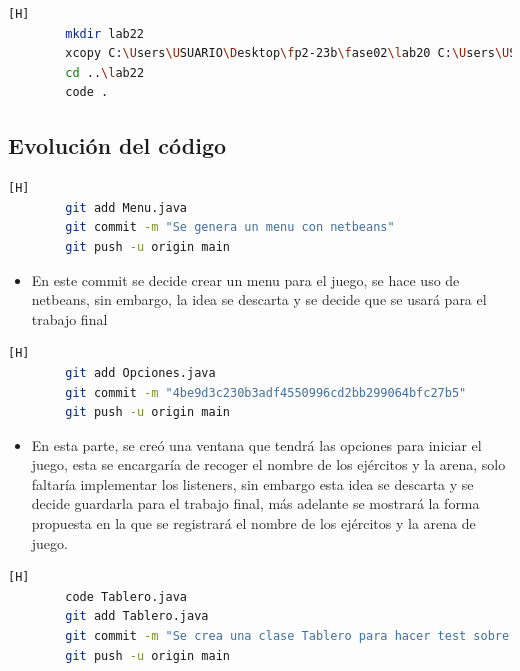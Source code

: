 \documentclass{article}
\begin{document}
	\begin{lstlisting}[language=bash,caption={Se crea la carpeta de laboratorio 20 y se copian los archivos del lab012 al lab20 }][H]
		mkdir lab22
		xcopy C:\Users\USUARIO\Desktop\fp2-23b\fase02\lab20 C:\Users\USUARIO\Desktop\fp2-23b\fase02\lab22 /s /e
		cd ..\lab22
		code .
	\end{lstlisting}
	
	
	

	
	\subsection{Evolución del código}
	
	
	\begin{lstlisting}[language=bash,caption={Commit: d4ded5435b38f7e1e79f718e82fcf34e773e4dd9 }][H]
		git add Menu.java
		git commit -m "Se genera un menu con netbeans"			
		git push -u origin main
	\end{lstlisting}
	
	\begin{itemize}	
	\item En este commit se decide crear un menu para el juego, se hace uso de netbeans, sin embargo, la idea se descarta y se decide que se usará para el trabajo final
	\end{itemize}
	
	
	

	
	
	\begin{lstlisting}[language=bash,caption={Commit: 7108905874788aafe3a0774d8a976766b0b840fd }][H]
		git add Opciones.java
		git commit -m "4be9d3c230b3adf4550996cd2bb299064bfc27b5"			
		git push -u origin main
	\end{lstlisting}
	
	\begin{itemize}	
	\item En esta parte, se creó una ventana que tendrá las opciones para iniciar el juego, esta se encargaría de recoger el nombre de los ejércitos y la arena, solo faltaría implementar los listeners, sin embargo esta idea se descarta y se decide guardarla para el trabajo final, más adelante se mostrará la forma propuesta en la que se registrará el nombre de los ejércitos y la arena de juego.
	\end{itemize}
	
	
	
	\begin{lstlisting}[language=bash,caption={Commit: 0d9b85edbec5ba2b5bc7e220d8d7db654ee05d02 }][H]
		code Tablero.java
		git add Tablero.java
		git commit -m "Se crea una clase Tablero para hacer test sobre como se imprimiria una matiz de botones"			
		git push -u origin main
	\end{lstlisting}
	
\end{document}
